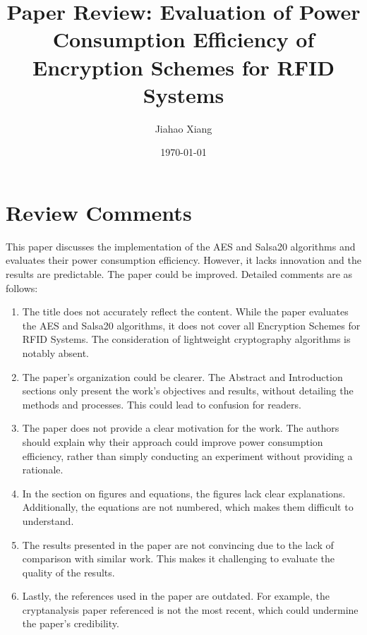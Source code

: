 \documentclass{article}
\title{Paper Review: Evaluation of Power Consumption Efficiency of Encryption Schemes for RFID Systems}
\author{Jiahao Xiang}
\date{\today}
\begin{document}
\maketitle

\section{Review Comments}

This paper discusses the implementation of the AES and Salsa20 algorithms and evaluates their power consumption efficiency. However, it lacks innovation and the results are predictable. The paper could be improved. Detailed comments are as follows:

\begin{enumerate}
    \item The title does not accurately reflect the content. While the paper evaluates the AES and Salsa20 algorithms, it does not cover all Encryption Schemes for RFID Systems. The consideration of lightweight cryptography algorithms is notably absent.
    \item The paper's organization could be clearer. The Abstract and Introduction sections only present the work's objectives and results, without detailing the methods and processes. This could lead to confusion for readers.
    \item The paper does not provide a clear motivation for the work. The authors should explain why their approach could improve power consumption efficiency, rather than simply conducting an experiment without providing a rationale.
    \item In the section on figures and equations, the figures lack clear explanations. Additionally, the equations are not numbered, which makes them difficult to understand.
    \item The results presented in the paper are not convincing due to the lack of comparison with similar work. This makes it challenging to evaluate the quality of the results.
    \item Lastly, the references used in the paper are outdated. For example, the cryptanalysis paper referenced is not the most recent, which could undermine the paper's credibility.
\end{enumerate}

\end{document}
